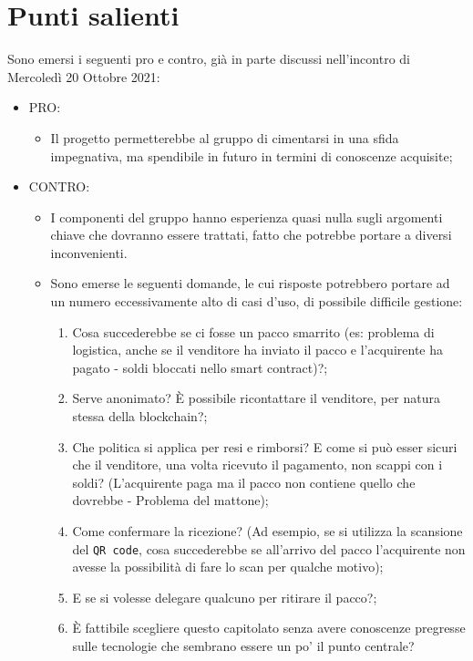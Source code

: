 \documentclass[11pt]{article}
\begin{document}
	\newpage

	\section{Punti salienti}
		Sono emersi i seguenti pro e contro, già in parte discussi nell'incontro di Mercoledì 20 Ottobre 2021:
		\begin{itemize}
			\item PRO:
			\begin{itemize}
				\item Il progetto permetterebbe al gruppo di cimentarsi in una sfida impegnativa, ma spendibile in futuro
				in termini di conoscenze acquisite;
			\end{itemize}
			\item CONTRO:
				\begin{itemize}
				\item I componenti del gruppo hanno esperienza quasi nulla sugli argomenti chiave che dovranno essere
				trattati, fatto che potrebbe portare a diversi inconvenienti.
				\item Sono emerse le seguenti domande, le cui risposte potrebbero portare ad un numero eccessivamente
				alto di casi d'uso, di possibile difficile gestione:
				\begin{enumerate}
					\item Cosa succederebbe se ci fosse un pacco smarrito (es: problema di logistica, anche se il venditore
					ha inviato il pacco e l'acquirente ha pagato - soldi bloccati nello smart contract)?;
					\item Serve anonimato? È possibile ricontattare il venditore, per natura stessa della blockchain?;
					\item Che politica si applica per resi e rimborsi? E come si può esser sicuri che il venditore, una volta
					ricevuto il pagamento, non scappi con i soldi? (L'acquirente paga ma il pacco non contiene quello che dovrebbe -
					Problema del mattone);
					\item Come confermare la ricezione? (Ad esempio, se si utilizza la scansione del \texttt{QR code}, cosa
					succederebbe se all'arrivo del pacco l'acquirente non avesse la possibilità di fare lo scan per qualche motivo);
					\item E se si volesse delegare qualcuno per ritirare il pacco?;
					\item È fattibile scegliere questo capitolato senza avere conoscenze pregresse sulle tecnologie che
					sembrano essere un po' il punto centrale?
				\end{enumerate}
			\end{itemize}
		\end{itemize}
\end{document}
